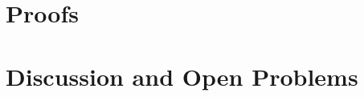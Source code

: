 \documentclass[12pt,a4paper]{article}
\numberwithin{equation}{section}
\newtheorem{proposition}[theorem]{Proposition}
\numberwithin{equation}{section}
\renewcommand{\epsilon}{\varepsilon}
\newcommand{\1}{{\text{\Large $\mathfrak 1$}}}
\newcommand{\2}[1]{{\text{\Large $\mathfrak 1$}\!\left(#1\right)}}
\begin{document}
\section{Proofs}

\section{Discussion and Open Problems}


%
%
%
%
\end{document}
